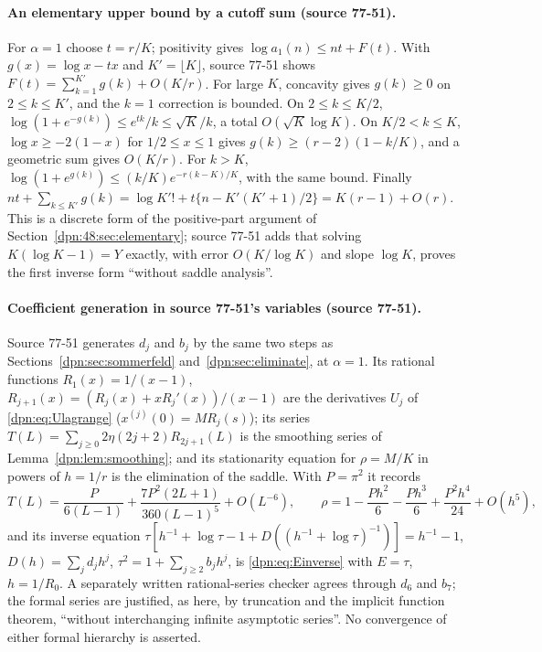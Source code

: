 \documentclass[11pt]{article}
\numberwithin{equation}{section}
\theoremstyle{definition}\newtheorem{definition}[theorem]{Definition}
\theoremstyle{remark}\newtheorem{remark}[theorem]{Remark}
\newcommand{\src}[1]{\textup{(source #1)}}
\begin{document}
\paragraph{An elementary upper bound by a cutoff sum \src{77-51}.}
For $\alpha=1$ choose $t=r/K$; positivity gives $\log a_1(n)\le nt+F(t)$.  With
$g(x)=\log x-tx$ and $K'=\lfloor K\rfloor$, source 77-51 shows
$F(t)=\sum_{k=1}^{K'}g(k)+O(K/r)$.  For large $K$, concavity gives $g(k)\ge0$
on $2\le k\le K'$, and the $k=1$ correction is bounded.  On $2\le k\le K/2$,
$\log(1+e^{-g(k)})\le e^{tk}/k\le\sqrt K/k$, a total $O(\sqrt K\log K)$.  On
$K/2<k\le K$, $\log x\ge-2(1-x)$ for $1/2\le x\le1$ gives $g(k)\ge(r-2)(1-k/K)$,
and a geometric sum gives $O(K/r)$.  For $k>K$,
$\log(1+e^{g(k)})\le(k/K)e^{-r(k-K)/K}$, with the same bound.  Finally
$nt+\sum_{k\le K'}g(k)=\log K'!+t\{n-K'(K'+1)/2\}=K(r-1)+O(r)$.  This is a
discrete form of the positive-part argument of
Section~\ref{dpn:48:sec:elementary}; source 77-51 adds that solving
$K(\log K-1)=Y$ exactly, with error $O(K/\log K)$ and slope $\log K$, proves
the first inverse form ``without saddle analysis''.

\paragraph{Coefficient generation in source 77-51's variables \src{77-51}.}
Source 77-51 generates $d_j$ and $b_j$ by the same two steps as
Sections~\ref{dpn:sec:sommerfeld} and~\ref{dpn:sec:eliminate}, at $\alpha=1$.
Its rational functions $R_1(x)=1/(x-1)$,
$R_{j+1}(x)=(R_j(x)+xR_j'(x))/(x-1)$ are the derivatives $U_j$ of
\eqref{dpn:eq:Ulagrange} ($x^{(j)}(0)=MR_j(s)$); its series
$T(L)=\sum_{j\ge0}2\eta(2j+2)R_{2j+1}(L)$ is the smoothing series of
Lemma~\ref{dpn:lem:smoothing}; and its stationarity equation for
$\rho=M/K$ in powers of $h=1/r$ is the elimination of the saddle.  With
$P=\pi^2$ it records
\[
 T(L)=\frac{P}{6(L-1)}+\frac{7P^2(2L+1)}{360(L-1)^5}+O(L^{-6}),\qquad
 \rho=1-\frac{Ph^2}6-\frac{Ph^3}6+\frac{P^2h^4}{24}+O(h^5),
\]
and its inverse equation
$\tau[h^{-1}+\log\tau-1+D((h^{-1}+\log\tau)^{-1})]=h^{-1}-1$,
$D(h)=\sum_jd_jh^j$, $\tau^2=1+\sum_{j\ge2}b_jh^j$, is \eqref{dpn:eq:Einverse}
with $E=\tau$, $h=1/R_0$.  A separately written rational-series checker agrees
through $d_6$ and $b_7$; the formal series are justified, as here, by
truncation and the implicit function theorem, ``without interchanging
infinite asymptotic series''.  No convergence of either formal hierarchy is
asserted.
\end{document}
